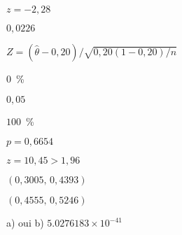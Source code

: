 \begin{reponse}{6.8}
    \begin{inparaenum}
    \item $z = -2,28$
    \item $0,0226$
    \end{inparaenum}
  
\end{reponse}
\begin{reponse}{6.9}
    \begin{inparaenum}
      \item $Z = (\hat{\theta} - 0,20)/\sqrt{0,20 (1 - 0,20)/n}$
      \item $0$~\%
      \item $0,05$
      \item $100$~\%
      \item $p = 0,6654$
    \end{inparaenum}
  
\end{reponse}
\begin{reponse}{6.10}
    \begin{inparaenum}
    \item $z = 10,45 > 1,96$
    \item $(0,3005, \, 0,4393)$
    \item $(0,4555, \, 0,5246)$
    \end{inparaenum}
  
\end{reponse}
\begin{reponse}{6.12}
a) oui \quad b) $\ensuremath{5.0276183\times 10^{-41}}$
\end{reponse}
